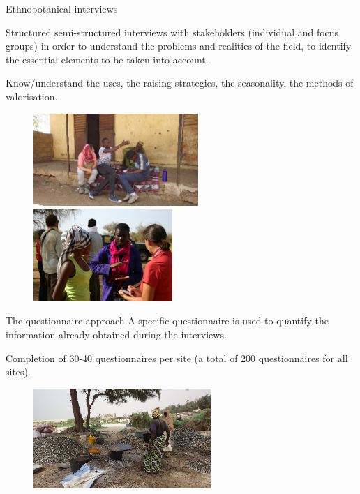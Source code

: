 \documentclass[newPxFont]{beamer}
\begin{document}
\begin{frame}[c]{Ethnobotanical interviews}
\vspace{-1cm}

Structured semi-structured interviews with stakeholders (individual and focus groups) in order to understand the problems and realities of the field, to identify the essential elements to be taken into account.

Know/understand the uses, the raising strategies, the seasonality, the methods of valorisation.


\begin{figure}
	\hspace{-1.5em}
	\includegraphics[height = 3.5cm]{img/group3.png}~
  \includegraphics[height = 3.5cm]{img/group2.png}
\end{figure}
\end{frame}

\begin{frame}[c]{The questionnaire approach}
\vspace{-1cm}
A specific questionnaire is used to quantify the information already obtained during the interviews.

Completion of 30-40 questionnaires per site (a total of 200 questionnaires for all sites).
\begin{figure}
	\centering
	\includegraphics[width = 0.6\textwidth]{img/Khoudia.png}
\end{figure}

\end{frame}
\end{document}
